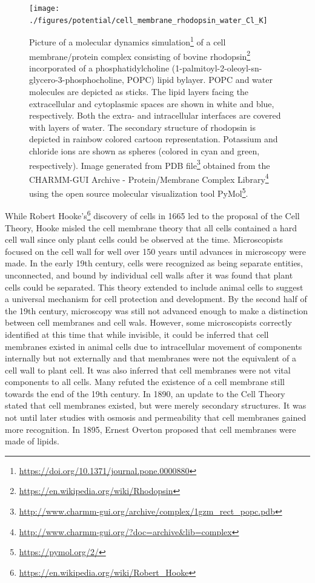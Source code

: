 \documentclass[
]{book}
\renewcommand{\href}[2]{#2\footnote{\url{#1}}}
\begin{document}
\begin{figure}

{\centering \texttt{[image: ./figures/potential/cell\_membrane\_rhodopsin\_water\_Cl\_K]} 

}

\caption{Picture of a \href{https://doi.org/10.1371/journal.pone.0000880}{molecular dynamics simulation} of a cell membrane/protein complex consisting of bovine \href{https://en.wikipedia.org/wiki/Rhodopsin}{rhodopsin} incorporated of a phosphatidylcholine (1-palmitoyl-2-oleoyl-sn-glycero-3-phosphocholine, POPC) lipid bylayer. POPC and water molecules are depicted as sticks. The lipid layers facing the extracellular and cytoplasmic spaces are shown in white and blue, respectively. Both the extra- and intracellular interfaces are covered with layers of water. The secondary structure of rhodopsin is depicted in rainbow colored cartoon representation. Potassium and chloride ions are shown as spheres (colored in cyan and green, respectively). Image generated from \href{http://www.charmm-gui.org/archive/complex/1gzm_rect_popc.pdb}{PDB file} obtained from the \href{http://www.charmm-gui.org/?doc=archive\&lib=complex}{CHARMM-GUI Archive - Protein/Membrane Complex Library} using the open source molecular visualization tool \href{https://pymol.org/2/}{PyMol}.}\label{fig:cellmembrane}
\end{figure}

While \href{https://en.wikipedia.org/wiki/Robert_Hooke}{Robert Hooke's} discovery of cells in 1665 led to the proposal of the Cell Theory, Hooke misled the cell membrane theory that all cells contained a hard cell wall since only plant cells could be observed at the time. Microscopists focused on the cell wall for well over 150 years until advances in microscopy were made. In the early 19th century, cells were recognized as being separate entities, unconnected, and bound by individual cell walls after it was found that plant cells could be separated. This theory extended to include animal cells to suggest a universal mechanism for cell protection and development. By the second half of the 19th century, microscopy was still not advanced enough to make a distinction between cell membranes and cell wals. However, some microscopists correctly identified at this time that while invisible, it could be inferred that cell membranes existed in animal cells due to intracellular movement of components internally but not externally and that membranes were not the equivalent of a cell wall to plant cell. It was also inferred that cell membranes were not vital components to all cells. Many refuted the existence of a cell membrane still towards the end of the 19th century. In 1890, an update to the Cell Theory stated that cell membranes existed, but were merely secondary structures. It was not until later studies with osmosis and permeability that cell membranes gained more recognition. In 1895, Ernest Overton proposed that cell membranes were made of lipids.
\end{document}
